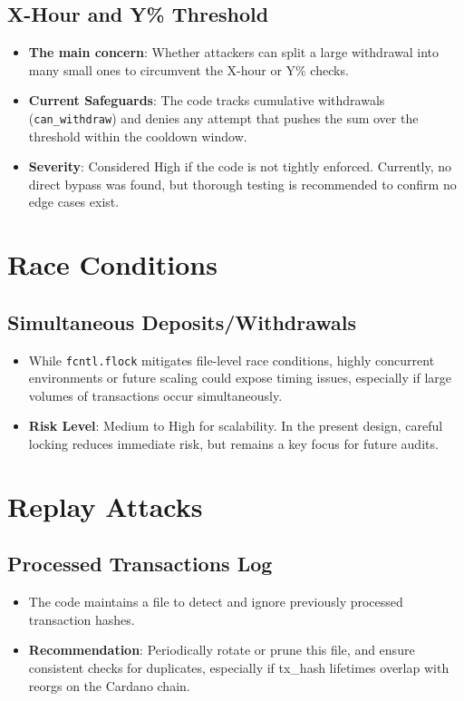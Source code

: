 \documentclass[11pt,a4paper]{report}
\begin{document}
\subsection{X-Hour and Y\% Threshold}
\begin{itemize}
    \item \textbf{The main concern}: Whether attackers can split a large withdrawal into many small ones to circumvent the X-hour or Y\% checks.
    \item \textbf{Current Safeguards}: The code tracks cumulative withdrawals (\texttt{can\_withdraw}) and denies any attempt that pushes the sum over the threshold within the cooldown window.
    \item \textbf{Severity}: Considered High if the code is not tightly enforced. Currently, no direct bypass was found, but thorough testing is recommended to confirm no edge cases exist.
\end{itemize}

\section{Race Conditions}

\subsection{Simultaneous Deposits/Withdrawals}
\begin{itemize}
    \item While \texttt{fcntl.flock} mitigates file-level race conditions, highly concurrent environments or future scaling could expose timing issues, especially if large volumes of transactions occur simultaneously.
    \item \textbf{Risk Level}: Medium to High for scalability. In the present design, careful locking reduces immediate risk, but remains a key focus for future audits.
\end{itemize}

\section{Replay Attacks}

\subsection{Processed Transactions Log}
\begin{itemize}
    \item The code maintains a file to detect and ignore previously processed transaction hashes.
    \item \textbf{Recommendation}: Periodically rotate or prune this file, and ensure consistent checks for duplicates, especially if tx\_hash lifetimes overlap with reorgs on the Cardano chain.
\end{itemize}
\end{document}
